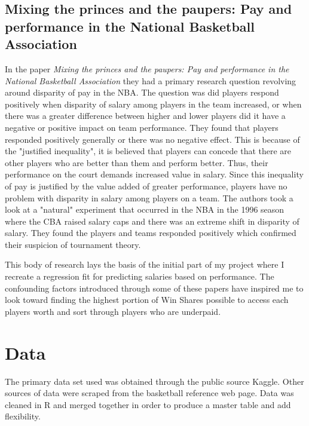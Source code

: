 \documentclass[12pt,english]{article}
\begin{document}
\subsection{Mixing the princes and the paupers: Pay and performance in the National Basketball Association}
In the paper \textit{Mixing the princes and the paupers: Pay and performance in the National Basketball Association} \cite{SIMMONS2011381} they had a primary research question revolving around disparity of pay in the NBA. The question was did players respond positively when disparity of salary among players in the team increased, or when there was a greater difference between higher and lower players did it have a negative or positive impact on team performance. They found that players responded positively generally or there was no negative effect. This is because of the "justified inequality", it is believed that players can concede that there are other players who are better than them and perform better. Thus, their performance on the court demands increased value in salary. Since this inequality of pay is justified by the value added of greater performance, players have no problem with disparity in salary among players on a team. The authors took a look at a "natural" experiment that occurred in the NBA in the 1996 season where the CBA raised salary caps and there was an extreme shift in disparity of salary. They found the players and teams responded positively which confirmed their suspicion of tournament theory. 

\vspace{3mm}
\indent
This body of research lays the basis of the initial part of my project where I recreate a regression fit for predicting salaries based on performance. The confounding factors introduced through some of these papers have inspired me to look toward finding the highest portion of Win Shares possible to access each players  worth and sort through players who are underpaid. 
\newpage
\section{Data}\label{sec:data}
The primary data set used was obtained through the public source Kaggle. Other sources of data were scraped from the  basketball reference web page. Data was cleaned in R and merged together in order to produce a master table and add flexibility.
\end{document}
